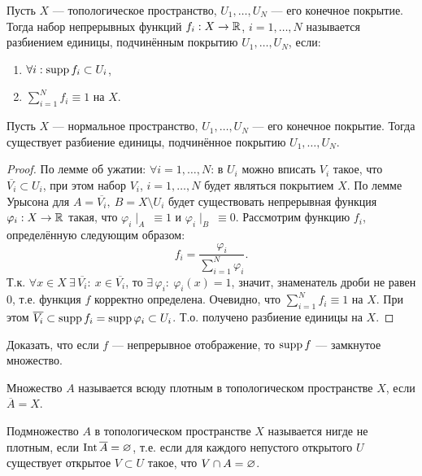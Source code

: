 \begin{definition}
    Пусть $X$ --- топологическое пространство, $U_1, \ldots, U_N$ --- его конечное покрытие. Тогда набор непрерывных функций $f_i: X \to \mathbb{R}$, $i = 1, \ldots, N$ называется разбиением единицы, подчинённым покрытию $U_1, \ldots, U_N$, если:
    \begin{enumerate}
        \item $\forall i: \operatorname{supp} f_i \subset U_i$,
        \item $\sum_{i = 1}^{N} f_i \equiv 1$ на $X$.
    \end{enumerate}
\end{definition}

\begin{theorem}
    Пусть $X$ --- нормальное пространство, $U_1, \ldots, U_N$ --- его конечное покрытие. Тогда существует разбиение единицы, подчинённое покрытию $U_1, \ldots, U_N$.
\end{theorem}
\begin{proof}
        По лемме об ужатии: $\forall i = 1, \ldots, N$: в $U_i$ можно вписать $V_i$ такое, что $\overline{V_i} \subset U_i$, при этом набор $V_i$, $i = 1, \ldots, N$ будет являться покрытием $X$.
        По лемме Урысона для $A = \overline{V_i}, \ B = X \setminus U_i$ будет существовать непрерывная функция $\varphi_i: X \to \mathbb{R}$ такая, что $\varphi_i \!\mid_A \ \equiv 1$ и $\varphi_i \!\mid_B \ \equiv 0$.
        Рассмотрим функцию $f_i$, определённую следующим образом:
        \[
            f_i = \frac{\varphi_i}{\sum_{i = 1}^{N}\varphi_i}.
        \]
        Т.к. $\forall x \in X \ \exists \, \overline{V_i}: \ x \in \overline{V_i}$, то $\exists \, \varphi_i: \ \varphi_i(x) = 1$, значит, знаменатель дроби не равен $0$, т.е. функция $f$ корректно определена.
        Очевидно, что $\sum_{i = 1}^{N} f_i \equiv 1$ на $X$. При этом $\overline{V_i} \subset \operatorname{supp} f_i = \operatorname{supp} \varphi_i \subset U_i$. Т.о. получено разбиение единицы на $X$.
\end{proof}

\begin{exercise}
    Доказать, что если $f$ --- непрерывное отображение, то $\operatorname{supp} f$ --- замкнутое множество.
\end{exercise}

\begin{definition}
    Множество $A$ называется всюду плотным в топологическом пространстве $X$, если $\overline{A} = X$.
\end{definition}

\begin{definition}
    Подмножество $A$ в топологическом пространстве $X$ называется нигде не плотным, если $\operatorname{Int} \overline{A} = \varnothing$, т.е. если для каждого непустого открытого $U$ существует открытое $V \subset U$ такое, что $V \cap A = \varnothing$.
\end{definition}

